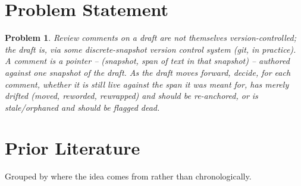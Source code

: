\documentclass{amsart}
\newtheorem*{prob}{Problem}
\theoremstyle{remark}
\begin{document}
    \section{Problem Statement}
    \begin{prob}
        Review comments on a draft are not themselves version-controlled; the draft is, via some discrete-snapshot version control system (git, in practice). A comment is a pointer -- (snapshot, span of text in that snapshot) -- authored against one snapshot of the draft. As the draft moves forward, decide, for each comment, whether it is still live against the span it was meant for, has merely drifted (moved, reworded, rewrapped) and should be re-anchored, or is stale/orphaned and should be flagged dead.
    \end{prob}

    \section{Prior Literature}
    Grouped by where the idea comes from rather than chronologically.
\end{document}
